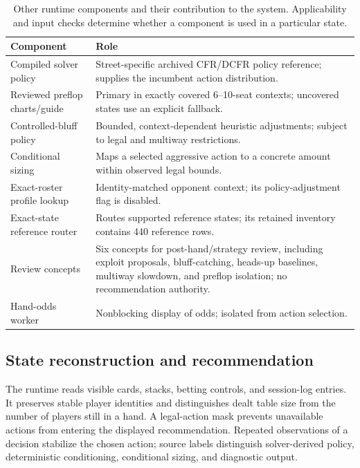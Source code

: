 \documentclass[11pt]{article}
\begin{document}
\begin{table}[!htbp]
\centering\small
\caption{Other runtime components and their contribution to the system. Applicability and input checks determine whether a component is used in a particular state.}
\label{tab:components}
\begin{tabularx}{\textwidth}{p{}Y}
\toprule
Component & Role \\
\midrule
Compiled solver policy & Street-specific archived CFR/DCFR policy reference; supplies the incumbent action distribution. \\
Reviewed preflop charts/guide & Primary in exactly covered 6--10-seat contexts; uncovered states use an explicit fallback. \\
Controlled-bluff policy & Bounded, context-dependent heuristic adjustments; subject to legal and multiway restrictions. \\
Conditional sizing & Maps a selected aggressive action to a concrete amount within observed legal bounds. \\
Exact-roster profile lookup & Identity-matched opponent context; its policy-adjustment flag is disabled. \\
Exact-state reference router & Routes supported reference states; its retained inventory contains 440 reference rows. \\
Review concepts & Six concepts for post-hand/strategy review, including exploit proposals, bluff-catching, heads-up baselines, multiway slowdown, and preflop isolation; no recommendation authority. \\
Hand-odds worker & Nonblocking display of odds; isolated from action selection. \\
\bottomrule
\end{tabularx}
\end{table}

\subsection{State reconstruction and recommendation}
The runtime reads visible cards, stacks, betting controls, and session-log entries. It preserves stable player identities and distinguishes dealt table size from the number of players still in a hand. A legal-action mask prevents unavailable actions from entering the displayed recommendation. Repeated observations of a decision stabilize the chosen action; source labels distinguish solver-derived policy, deterministic conditioning, conditional sizing, and diagnostic output.
\end{document}
